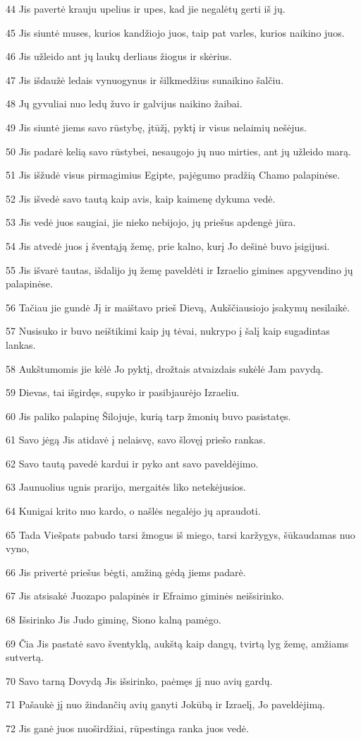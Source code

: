 \par 44 Jis pavertė krauju upelius ir upes, kad jie negalėtų gerti iš jų. 
\par 45 Jis siuntė muses, kurios kandžiojo juos, taip pat varles, kurios naikino juos. 
\par 46 Jis užleido ant jų laukų derliaus žiogus ir skėrius. 
\par 47 Jis išdaužė ledais vynuogynus ir šilkmedžius sunaikino šalčiu. 
\par 48 Jų gyvuliai nuo ledų žuvo ir galvijus naikino žaibai. 
\par 49 Jis siuntė jiems savo rūstybę, įtūžį, pyktį ir visus nelaimių nešėjus. 
\par 50 Jis padarė kelią savo rūstybei, nesaugojo jų nuo mirties, ant jų užleido marą. 
\par 51 Jis išžudė visus pirmagimius Egipte, pajėgumo pradžią Chamo palapinėse. 
\par 52 Jis išvedė savo tautą kaip avis, kaip kaimenę dykuma vedė. 
\par 53 Jis vedė juos saugiai, jie nieko nebijojo, jų priešus apdengė jūra. 
\par 54 Jis atvedė juos į šventąją žemę, prie kalno, kurį Jo dešinė buvo įsigijusi. 
\par 55 Jis išvarė tautas, išdalijo jų žemę paveldėti ir Izraelio gimines apgyvendino jų palapinėse. 
\par 56 Tačiau jie gundė Jį ir maištavo prieš Dievą, Aukščiausiojo įsakymų nesilaikė. 
\par 57 Nusisuko ir buvo neištikimi kaip jų tėvai, nukrypo į šalį kaip sugadintas lankas. 
\par 58 Aukštumomis jie kėlė Jo pyktį, drožtais atvaizdais sukėlė Jam pavydą. 
\par 59 Dievas, tai išgirdęs, supyko ir pasibjaurėjo Izraeliu. 
\par 60 Jis paliko palapinę Šilojuje, kurią tarp žmonių buvo pasistatęs. 
\par 61 Savo jėgą Jis atidavė į nelaisvę, savo šlovę­į priešo rankas. 
\par 62 Savo tautą pavedė kardui ir pyko ant savo paveldėjimo. 
\par 63 Jaunuolius ugnis prarijo, mergaitės liko netekėjusios. 
\par 64 Kunigai krito nuo kardo, o našlės negalėjo jų apraudoti. 
\par 65 Tada Viešpats pabudo tarsi žmogus iš miego, tarsi karžygys, šūkaudamas nuo vyno, 
\par 66 Jis privertė priešus bėgti, amžiną gėdą jiems padarė. 
\par 67 Jis atsisakė Juozapo palapinės ir Efraimo giminės neišsirinko. 
\par 68 Išsirinko Jis Judo giminę, Siono kalną pamėgo. 
\par 69 Čia Jis pastatė savo šventyklą, aukštą kaip dangų, tvirtą lyg žemę, amžiams sutvertą. 
\par 70 Savo tarną Dovydą Jis išsirinko, paėmęs jį nuo avių gardų. 
\par 71 Pašaukė jį nuo žindančių avių ganyti Jokūbą ir Izraelį, Jo paveldėjimą. 
\par 72 Jis ganė juos nuoširdžiai, rūpestinga ranka juos vedė.


